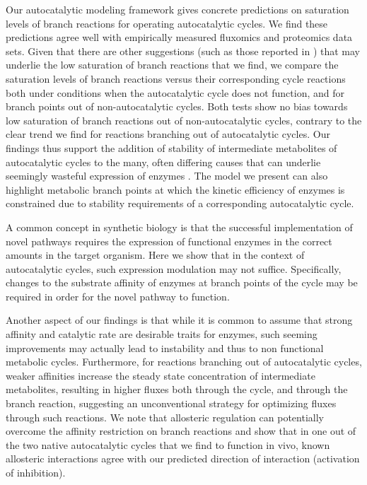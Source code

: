 Our autocatalytic modeling framework gives concrete predictions on saturation levels of branch reactions for operating autocatalytic cycles.
We find these predictions agree well with empirically measured fluxomics and proteomics data sets.
Given that there are other suggestions (such as those reported in \cite{Staples1997-fq,Weiss1998-gp,Suarez1997-jo}) that may underlie the low saturation of branch reactions that we find, we compare the saturation levels of branch reactions versus their corresponding cycle reactions both under conditions when the autocatalytic cycle does not function, and for branch points out of non-autocatalytic cycles.
Both tests show no bias towards low saturation of branch reactions out of non-autocatalytic cycles, contrary to the clear trend we find for reactions branching out of autocatalytic cycles.
Our findings thus support the addition of stability of intermediate metabolites of autocatalytic cycles to the many, often differing causes that can underlie seemingly wasteful expression of enzymes \cite{Salvador2003-fc, Salvador2006-yx}.
The model we present can also highlight metabolic branch points at which the kinetic efficiency of enzymes is constrained due to stability requirements of a corresponding autocatalytic cycle.

A common concept in synthetic biology is that the successful implementation of novel pathways requires the expression of functional enzymes in the correct amounts in the target organism.
Here we show that in the context of autocatalytic cycles, such expression modulation may not suffice.
Specifically, changes to the substrate affinity of enzymes at branch points of the cycle may be required in order for the novel pathway to function.

Another aspect of our findings is that while it is common to assume that strong affinity and catalytic rate are desirable traits for enzymes, such seeming improvements may actually lead to instability and thus to non functional metabolic cycles.
Furthermore, for reactions branching out of autocatalytic cycles, weaker affinities increase the steady state concentration of intermediate metabolites, resulting in higher fluxes both through the cycle, and through the branch reaction, suggesting an unconventional strategy for optimizing fluxes through such reactions.
We note that allosteric regulation can potentially overcome the affinity restriction on branch reactions and show that in one out of the two native autocatalytic cycles that we find to function in vivo, known allosteric interactions agree with our predicted direction of interaction (activation of inhibition).

